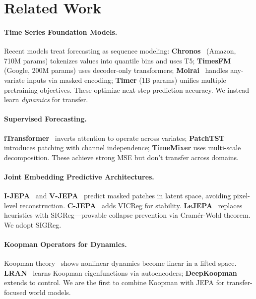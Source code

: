 \documentclass{article}
\begin{document}
\section{Related Work}

\paragraph{Time Series Foundation Models.}
Recent models treat forecasting as sequence modeling:
\textbf{Chronos}~\cite{chronos} (Amazon, 710M params) tokenizes values into quantile bins and uses T5;
\textbf{TimesFM} (Google, 200M params) uses decoder-only transformers;
\textbf{Moirai}~\cite{moirai} handles any-variate inputs via masked encoding;
\textbf{Timer} (1B params) unifies multiple pretraining objectives.
These optimize next-step prediction accuracy. We instead learn \emph{dynamics} for transfer.

\paragraph{Supervised Forecasting.}
\textbf{iTransformer}~\cite{itransformer} inverts attention to operate across variates;
\textbf{PatchTST}~\cite{patchtst} introduces patching with channel independence;
\textbf{TimeMixer} uses multi-scale decomposition.
These achieve strong MSE but don't transfer across domains.

\paragraph{Joint Embedding Predictive Architectures.}
\textbf{I-JEPA}~\cite{ijepa} and \textbf{V-JEPA}~\cite{vjepa} predict masked patches in latent space, avoiding pixel-level reconstruction.
\textbf{C-JEPA}~\cite{cjepa} adds VICReg for stability.
\textbf{LeJEPA}~\cite{lejepa2024} replaces heuristics with SIGReg—provable collapse prevention via Cramér-Wold theorem. We adopt SIGReg.

\paragraph{Koopman Operators for Dynamics.}
Koopman theory~\cite{koopman1931,brunton2021modern} shows nonlinear dynamics become linear in a lifted space.
\textbf{LRAN}~\cite{lusch2018deep} learns Koopman eigenfunctions via autoencoders;
\textbf{DeepKoopman} extends to control.
We are the first to combine Koopman with JEPA for transfer-focused world models.
\end{document}
